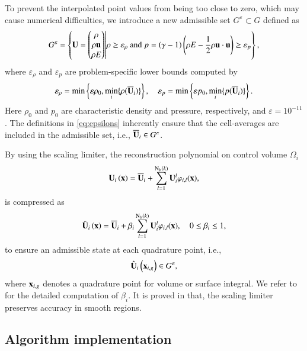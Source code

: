 To prevent the interpolated point values from being too close to zero, which may cause numerical difficulties, we introduce a new admissible set $G^\varepsilon \subset G$ defined as
\begin{equation}
    G^\varepsilon= \left\{
    \mathbf{U} =  \begin{pmatrix}
        \rho \\ \rho \mathbf{u} \\ \rho E
    \end{pmatrix} \middle|
    \rho  \geq \varepsilon_\rho
    \text{ and }
    p=\left(\gamma-1\right) \left(\rho E - \dfrac{1}{2} \rho \mathbf{u} \cdot \mathbf{u}\right) \geq \varepsilon_p
    \right\},
\end{equation}
where $\varepsilon_\rho$ and $\varepsilon_p$ are problem-specific lower bounds computed by
\begin{equation}\label{eq:epsilons}
    \varepsilon_\rho=\min\left\{\varepsilon \rho_0, \min_i\{\rho(\overline{\mathbf{U}}_i)\}\right\}, \quad 
    \varepsilon_p=\min\left\{\varepsilon p_0, \min_i\{p(\overline{\mathbf{U}}_i)\}\right\}.
\end{equation}
Here $\rho_0$ and $p_0$ are characteristic density and pressure, respectively, and $\varepsilon=10^{-11}$. The definitions in \eqref{eq:epsilons} inherently ensure that the cell-averages are included in the admissible set, i.e., $\overline{\mathbf{U}}_i \in G^\varepsilon$.

By using the scaling limiter, the reconstruction polynomial on control volume $\Omega_i$
\begin{equation}
    \mathbf{U}_{i} \left(\mathbf{x}\right) = \overline{\mathbf{U}}_{i} + \sum_{l=1}^{\mathrm{N_b}(k)}{\mathbf{U}_i^l\varphi_{i,l}(\mathbf{x})},
\end{equation}
is compressed as
\begin{equation}
\label{eq:polynomial-scaling}
    \hat{\mathbf{U}}_{i} \left(\mathbf{x}\right) = \overline{\mathbf{U}}_{i} + \beta_i \sum_{l=1}^{\mathrm{N_b}(k)}{\mathbf{U}_i^l\varphi_{i,l}(\mathbf{x})}, \quad 0 \leq \beta_i \leq 1,
\end{equation}
to ensure an admissible state at each quadrature point, i.e.,
\begin{equation}
    \hat{\mathbf{U}}_{i} \left(\mathbf{x}_{i,g}\right) \in G^{\varepsilon},
\end{equation}
where $\mathbf{x}_{i,g}$ denotes a quadrature point for volume or surface integral. We refer to \cite{zhang2010positivity} for the detailed computation of $\beta_i$. 
It is proved in \cite{zhang2010positivity} that, the scaling limiter preserves accuracy in smooth regions.

\subsection{Algorithm implementation}

